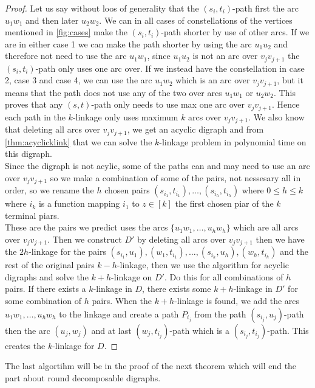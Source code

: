 \begin{proof}
    Let us say without loos of generality that the $(s_i,t_i)$-path first the arc $u_1w_1$ and then later $u_2w_2$.
    We can in all cases of constellations of the vertices mentioned in \autoref{fig:cases} make the $(s_i,t_i)$-path shorter by use of other arcs. 
    If we are in either case 1 we can make the path shorter by using the arc $u_1u_2$ and therefore not need to use the arc $u_1w_1$, since $u_1u_2$ is not an arc over $v_jv_{j+1}$ the $(s_i,t_i)$-path only uses one arc over.
    If we instead have the constellation in case 2, case 3 and case 4, we can use the arc $u_1w_2$ which is an arc over $v_jv_{j+1}$, but it means that the path does not use any of the two over arcs $u_1w_1$ or $u_2w_2$. 
    This proves that any $(s,t)$-path only needs to use max one arc over $v_jv_{j+1}$.
    Hence each path in the $k$-linkage only uses maximum $k$ arcs over $v_jv_{j+1}$.
    We also know that deleting all arcs over $v_jv_{j+1}$, we get an acyclic digraph and from \autoref{thm:acyclicklink} that we can solve the $k$-linkage problem in polynomial time on this digraph.\\
    Since the digraph is not acylic, some of the paths can and may need to use an arc over $v_jv_{j+1}$ so we make a combination of some of the pairs, not nessesary all in order, so we rename the $h$ chosen pairs $(s_{i_1},t_{i_1}),\dots ,(s_{i_h},t_{i_h})$ where $0\leq h\leq k$ where $i_k$ is a function mapping $i_1$ to $z\in [k]$ the first chosen piar of the $k$ terminal piars. \\
    These are the pairs we predict uses the arcs $\lbrace u_1w_1,\dots ,u_hw_h\rbrace$ which are all arcs over $v_jv_{j+1}$.
    Then we construct $D'$ by deleting all arcs over $v_jv_{j+1}$ then we have the $2h$-linkage for the pairs $(s_{i_1},u_1),(w_1,t_{i_1}),\dots ,(s_{i_h},u_h),(w_h,t_{i_h})$ and the rest of the original pairs $k-h$-linkage, then we use the algorithm for acyclic digraphs and solve the $k+h$-linkage on $D'$. Do this for all combinations of $h$ pairs. 
    If there exists a $k$-linkage in $D$, there exists some $k+h$-linkage in $D'$ for some combination of $h$ pairs.
    When the $k+h$-linkage is found, we add the arcs $u_1w_1,\dots , u_hw_h$ to the linkage and create a path $P_{i_j}$ from the path $(s_{i_j},u_j)$-path then the arc $(u_j,w_j)$ and at last  $(w_j,t_{i_j})$-path which is a $(s_{i_j},t_{i_j})$-path.
    This creates the $k$-linkage for $D$. 
\end{proof}
The last algortihm will be in the proof of the next theorem which will end the part about round decomposable digraphs.
